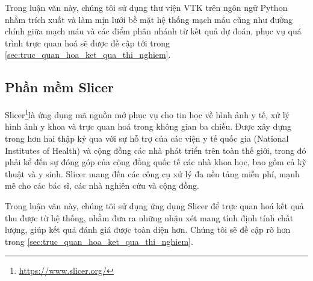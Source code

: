 	Trong luận văn này, chúng tôi sử dụng thư viện VTK trên ngôn ngữ Python nhằm trích xuất và làm mịn lưới bề mặt hệ thống mạch máu cũng như đường chính giữa mạch máu và các điểm phân nhánh từ kết quả dự đoán, phục vụ quá trình trực quan hoá sẽ được đề cập tới trong \autoref{sec:truc_quan_hoa_ket_qua_thi_nghiem}.

\subsection{Phần mềm Slicer}
\label{subsec:pham_mem_Slicer}
	Slicer\footnote{\url{https://www.slicer.org/}}là ứng dụng mã nguồn mở phục vụ cho tin học về hình ảnh y tế, xử lý hình ảnh y khoa và trực quan hoá trong không gian ba chiều. Được xây dựng trong hơn hai thập kỷ qua với sự hỗ trợ của các viện y tế quốc gia (National Institutes of Health) và cộng đồng các nhà phát triển trên toàn thế giới, trong đó phải kể đến sự đóng góp của cộng đồng quốc tế các nhà khoa học, bao gồm cả kỹ thuật và y sinh. Slicer mang đến các công cụ xử lý đa nền tảng miễn phí, mạnh mẽ cho các bác sĩ, các nhà nghiên cứu và cộng đồng.
	
	Trong luận văn này, chúng tôi sử dụng ứng dụng Slicer để trực quan hoá kết quả thu được từ hệ thống, nhằm đưa ra những nhận xét mang tính định tính chất lượng, giúp kết quả đánh giá được toàn diện hơn. Chúng tôi sẽ đề cập rõ hơn trong \autoref{sec:truc_quan_hoa_ket_qua_thi_nghiem}.